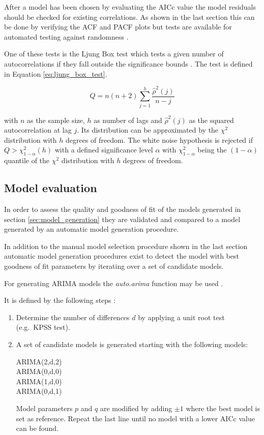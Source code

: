 After a model has been chosen by evaluating the AICc value the model residuals should be checked for existing correlations. As shown in the last section this can be done by verifying the ACF and PACF plots but tests are available for automated testing against randomness \cite{weron2007modeling,hyndman2012forecasting}. 

One of these tests is the Ljung Box test which tests a given number of autocorrelations if they fall outside the significance bounds \cite{weron2007modeling}. The test is defined in Equation \ref{eq:ljung_box_test}. 

\begin{equation}
	Q = n(n + 2) \sum_{j=1}^{h} \frac{\hat{\rho}^2 (j)}{n - j}
\label{eq:ljung_box_test}
\end{equation}

with $n$ as the sample size, $h$ as number of lags and $\hat{\rho}^2 (j)$ as the squared autocorrelation at lag $j$. 
Its distribution can be approximated by the $\chi^2$ distribution with $h$ degrees of freedom. The white noise hypothesis is rejected if $Q > \chi_{1-\alpha}^2 (h)$ with a defined significance level $\alpha$ with $\chi_{1-\alpha}^2$ being the $(1 - \alpha)$ quantile of the $\chi^2$ distribution with $h$ degrees of freedom. 


\subsection{Model evaluation} \label{ssec:model_evaluation}

In order to assess the quality and goodness of fit of the models generated in section \ref{sec:model_generation} they are validated and compared to a model generated by an automatic model generation procedure. 

In addition to the manual model selection procedure shown in the last section automatic model generation procedures exist to detect the model with best goodness of fit parameters by iterating over a set of candidate models. 

For generating ARIMA models the \textit{auto.arima} function may be used \cite{hyndman2012forecasting,r2016language}. 

It is defined by the following steps \cite{hyndman2012forecasting}: 

\begin{enumerate}
	\item Determine the number of differences $d$ by applying a unit root test (e.g.~KPSS test).
	\item A set of candidate models is generated starting with the following models: 
				
				ARIMA(2,d,2) \\
				ARIMA(0,d,0) \\
				ARIMA(1,d,0) \\
				ARIMA(0,d,1) 
				
				Model parameters $p$ and $q$ are modified by adding $\pm 1$ where the best model is set as reference. 
				Repeat the last line until no model with a lower AICc value can be found. 

\end{enumerate}

